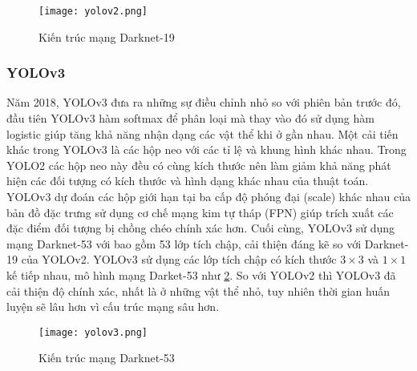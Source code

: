 \documentclass[../the.tex]{subfiles}
\begin{document}
\begin{figure}[H]
	\centering
	\texttt{[image: yolov2.png]}
	\caption{Kiến trúc mạng Darknet-19 \cite{redmon2016yolo9000}}
	\label{fig:yolov2}
\end{figure}
\bigskip

\subsubsection{YOLOv3}
{\fontsize{13}{12} \selectfont

	Năm 2018, YOLOv3 \cite{redmon2018yolov3} đưa ra những sự điều chỉnh nhỏ so với phiên bản trước đó, đầu tiên YOLOv3 hàm softmax để phân loại mà thay vào đó sử dụng
	hàm logistic giúp tăng khả năng nhận dạng các vật thể khi ở gần nhau. Một cải tiến khác trong YOLOv3 là các hộp neo với các tỉ lệ và khung hình khác nhau. Trong YOLO2 các hộp neo này đều có cùng kích thước
	nên làm giảm khả năng phát hiện các đối tượng có kích thước và hình dạng khác nhau của thuật toán. YOLOv3 dự đoán các hộp giới hạn tại ba cấp độ phóng đại (scale) khác nhau của bản đồ đặc trưng sử dụng cơ chế mạng kim tự tháp (FPN)  \cite{lin2017feature}
	giúp trích xuất các đặc điểm đối tượng bị chồng chéo chính xác hơn. Cuối cùng, YOLOv3 sử dụng mạng Darknet-53 với bao gồm 53 lớp tích chập, cải thiện đáng kẽ so với Darknet-19 của YOLOv2.
	YOLOv3 sử dụng các lớp tích chập có kích thước $3 \times 3 $ và $1 \times 1$ kế tiếp nhau, mô hình mạng Darket-53 như \ref{fig:yolov3}. So với YOLOv2 thì YOLOv3 đã cải thiện độ chính xác, nhất là ở những vật thể nhỏ, tuy nhiên thời gian huấn luyện sẽ lâu hơn vì cấu trúc mạng sâu hơn.

}

\begin{figure}[H]
	\centering
	\texttt{[image: yolov3.png]}
	\caption{Kiến trúc mạng Darknet-53 \cite{redmon2018yolov3}}
	\label{fig:yolov3}
\end{figure}
\bigskip
\end{document}
